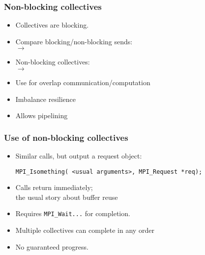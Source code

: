 
\begin{mpitwo}

\begin{exerciseframe}[onenorm]
  
\end{exerciseframe}
\end{mpitwo}


\begin{frame}[containsverbatim]\frametitle{Non-blocking collectives}
  \label{sl:coll-nonblock-intro}
  \begin{itemize}
  \item Collectives are blocking.
  \item Compare blocking/non-blocking sends:\\
     $\rightarrow$ 
  \item Non-blocking collectives:\\
     $\rightarrow$ 
  \item Use for overlap communication/computation
  \item Imbalance resilience
  \item Allows pipelining
  \end{itemize}
\end{frame}

\begin{frame}[containsverbatim]\frametitle{Use of non-blocking collectives}
  \label{sl:coll-nonblock-use}
  \begin{itemize}
  \item Similar calls, but output a request object:
\begin{lstlisting}
MPI_Isomething( <usual arguments>, MPI_Request *req);
\end{lstlisting}
  \item Calls return immediately;\\
    the usual story about buffer reuse
  \item Requires \lstinline{MPI_Wait}\texttt{...} for completion.
  \item Multiple collectives can complete in any order
  \item No guaranteed progress.
  \end{itemize}
\end{frame}

